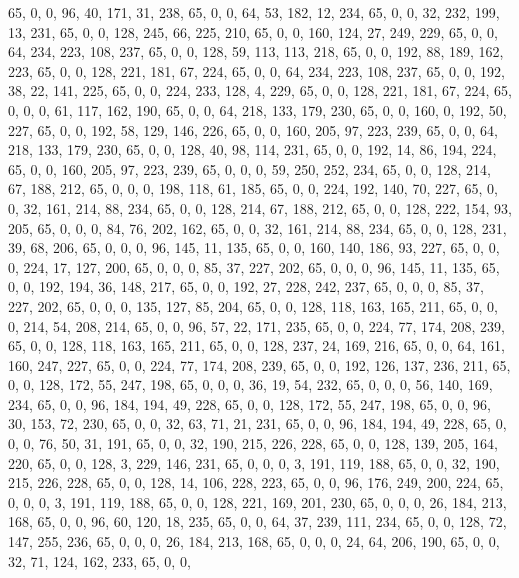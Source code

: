 \begin{DoxyCode}
       65, 0, 0, 96, 40, 171, 31, 238, 65, 0, 0, 64, 53, 182, 12, 234, 65, 0, 0, 32, 232, 199, 13, 231, 65, 0, 0,
       128, 245, 66, 225, 210, 65, 0, 0, 160, 124, 27, 249, 229, 65, 0, 0, 64, 234, 223, 108, 237, 65, 0, 0, 128, 59,
       113, 113, 218, 65, 0, 0, 192, 88, 189, 162, 223, 65, 0, 0, 128, 221, 181, 67, 224, 65, 0, 0, 64, 234, 223,
       108, 237, 65, 0, 0, 192, 38, 22, 141, 225, 65, 0, 0, 224, 233, 128, 4, 229, 65, 0, 0, 128, 221, 181, 67, 224,
       65, 0, 0, 0, 61, 117, 162, 190, 65, 0, 0, 64, 218, 133, 179, 230, 65, 0, 0, 160, 0, 192, 50, 227, 65, 0, 0,
       192, 58, 129, 146, 226, 65, 0, 0, 160, 205, 97, 223, 239, 65, 0, 0, 64, 218, 133, 179, 230, 65, 0, 0, 128,
       40, 98, 114, 231, 65, 0, 0, 192, 14, 86, 194, 224, 65, 0, 0, 160, 205, 97, 223, 239, 65, 0, 0, 0, 59, 250,
       252, 234, 65, 0, 0, 128, 214, 67, 188, 212, 65, 0, 0, 0, 198, 118, 61, 185, 65, 0, 0, 224, 192, 140, 70, 227,
       65, 0, 0, 32, 161, 214, 88, 234, 65, 0, 0, 128, 214, 67, 188, 212, 65, 0, 0, 128, 222, 154, 93, 205, 65, 0,
       0, 0, 84, 76, 202, 162, 65, 0, 0, 32, 161, 214, 88, 234, 65, 0, 0, 128, 231, 39, 68, 206, 65, 0, 0, 0, 96,
       145, 11, 135, 65, 0, 0, 160, 140, 186, 93, 227, 65, 0, 0, 0, 224, 17, 127, 200, 65, 0, 0, 0, 85, 37, 227,
       202, 65, 0, 0, 0, 96, 145, 11, 135, 65, 0, 0, 192, 194, 36, 148, 217, 65, 0, 0, 192, 27, 228, 242, 237, 65, 0,
       0, 0, 85, 37, 227, 202, 65, 0, 0, 0, 135, 127, 85, 204, 65, 0, 0, 128, 118, 163, 165, 211, 65, 0, 0, 0,
       214, 54, 208, 214, 65, 0, 0, 96, 57, 22, 171, 235, 65, 0, 0, 224, 77, 174, 208, 239, 65, 0, 0, 128, 118, 163,
       165, 211, 65, 0, 0, 128, 237, 24, 169, 216, 65, 0, 0, 64, 161, 160, 247, 227, 65, 0, 0, 224, 77, 174, 208,
       239, 65, 0, 0, 192, 126, 137, 236, 211, 65, 0, 0, 128, 172, 55, 247, 198, 65, 0, 0, 0, 36, 19, 54, 232, 65, 0,
       0, 0, 56, 140, 169, 234, 65, 0, 0, 96, 184, 194, 49, 228, 65, 0, 0, 128, 172, 55, 247, 198, 65, 0, 0, 96,
       30, 153, 72, 230, 65, 0, 0, 32, 63, 71, 21, 231, 65, 0, 0, 96, 184, 194, 49, 228, 65, 0, 0, 0, 76, 50, 31,
       191, 65, 0, 0, 32, 190, 215, 226, 228, 65, 0, 0, 128, 139, 205, 164, 220, 65, 0, 0, 128, 3, 229, 146, 231, 65,
       0, 0, 0, 3, 191, 119, 188, 65, 0, 0, 32, 190, 215, 226, 228, 65, 0, 0, 128, 14, 106, 228, 223, 65, 0, 0,
       96, 176, 249, 200, 224, 65, 0, 0, 0, 3, 191, 119, 188, 65, 0, 0, 128, 221, 169, 201, 230, 65, 0, 0, 0, 26,
       184, 213, 168, 65, 0, 0, 96, 60, 120, 18, 235, 65, 0, 0, 64, 37, 239, 111, 234, 65, 0, 0, 128, 72, 147, 255,
       236, 65, 0, 0, 0, 26, 184, 213, 168, 65, 0, 0, 0, 24, 64, 206, 190, 65, 0, 0, 32, 71, 124, 162, 233, 65, 0, 0,

\end{DoxyCode}
